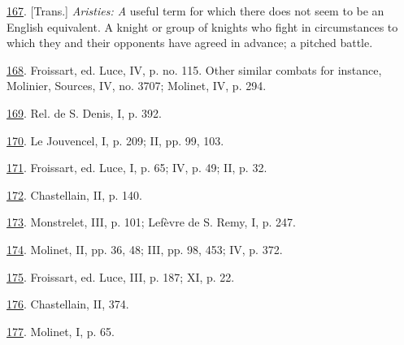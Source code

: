 \protect\hypertarget{23_NOTES.xhtmlux5cux23id_1603}{\protect\hyperlink{10_Chapter_Three__THE_HEROIC_DREAM.xhtmlux5cux23id_1602}{167}}.
{[}Trans.{]} \emph{Aristies: A} useful term for which there does not
seem to be an English equivalent. A knight or group of knights who fight
in circumstances to which they and their opponents have agreed in
advance; a pitched battle.

\protect\hypertarget{23_NOTES.xhtmlux5cux23id_1601}{\protect\hyperlink{10_Chapter_Three__THE_HEROIC_DREAM.xhtmlux5cux23id_1600}{168}}.
Froissart, ed. Luce, IV, p. no. 115. Other similar combats for instance,
Molinier, Sources, IV, no. 3707; Molinet, IV, p. 294.

\protect\hypertarget{23_NOTES.xhtmlux5cux23id_1599}{\protect\hyperlink{10_Chapter_Three__THE_HEROIC_DREAM.xhtmlux5cux23id_1598}{169}}.
Rel. de S. Denis, I, p. 392.

\protect\hypertarget{23_NOTES.xhtmlux5cux23id_1597}{\protect\hyperlink{10_Chapter_Three__THE_HEROIC_DREAM.xhtmlux5cux23id_1596}{170}}.
Le Jouvencel, I, p. 209; II, pp. 99, 103.

\protect\hypertarget{23_NOTES.xhtmlux5cux23id_1595}{\protect\hyperlink{10_Chapter_Three__THE_HEROIC_DREAM.xhtmlux5cux23id_1594}{171}}.
Froissart, ed. Luce, I, p. 65; IV, p. 49; II, p. 32.

\protect\hypertarget{23_NOTES.xhtmlux5cux23id_1593}{\protect\hyperlink{10_Chapter_Three__THE_HEROIC_DREAM.xhtmlux5cux23id_1592}{172}}.
Chastellain, II, p. 140.

\protect\hypertarget{23_NOTES.xhtmlux5cux23id_1591}{\protect\hyperlink{10_Chapter_Three__THE_HEROIC_DREAM.xhtmlux5cux23id_1590}{173}}.
Monstrelet, III, p. 101; Lefèvre de S. Remy, I, p. 247.

\protect\hypertarget{23_NOTES.xhtmlux5cux23id_1589}{\protect\hyperlink{10_Chapter_Three__THE_HEROIC_DREAM.xhtmlux5cux23id_1588}{174}}.
Molinet, II, pp. 36, 48; III, pp. 98, 453; IV, p. 372.

\protect\hypertarget{23_NOTES.xhtmlux5cux23id_1587}{\protect\hyperlink{10_Chapter_Three__THE_HEROIC_DREAM.xhtmlux5cux23id_1586}{175}}.
Froissart, ed. Luce, III, p. 187; XI, p. 22.

\protect\hypertarget{23_NOTES.xhtmlux5cux23id_1585}{\protect\hyperlink{10_Chapter_Three__THE_HEROIC_DREAM.xhtmlux5cux23id_1584}{176}}.
Chastellain, II, 374.

\protect\hypertarget{23_NOTES.xhtmlux5cux23id_1583}{\protect\hyperlink{10_Chapter_Three__THE_HEROIC_DREAM.xhtmlux5cux23id_1582}{177}}.
Molinet, I, p. 65.

